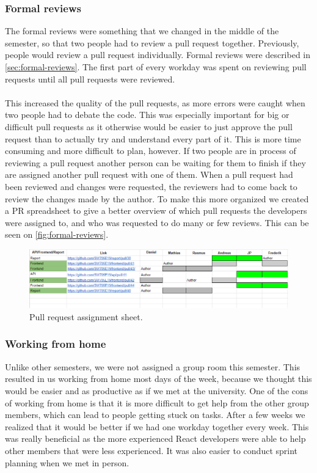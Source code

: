 \subsubsection{Formal reviews}
The formal reviews were something that we changed in the middle of the semester, so that two people had to review a pull request together.
Previously, people would review a pull request individually.
Formal reviews were described in \autoref{sec:formal-reviews}.
The first part of every workday was spent on reviewing pull requests until all pull requests were reviewed.
\\\\
This increased the quality of the pull requests, as more errors were caught when two people had to debate the code.
This was especially important for big or difficult pull requests as it otherwise would be easier to just approve the pull request than to actually try and understand every part of it.
This is more time consuming and more difficult to plan, however.
If two people are in process of reviewing a pull request another person can be waiting for them to finish if they are assigned another pull request with one of them. 
When a pull request had been reviewed and changes were requested, the reviewers had to come back to review the changes made by the author.
To make this more organized we created a PR spreadsheet to give a better overview of which pull requests the developers were assigned to, and who was requested to do many or few reviews.
This can be seen on \autoref{fig:formal-reviews}.
\begin{figure}[H]
    \centering
    \includegraphics[width=\linewidth]{figures/formal-reviews.PNG}
    \caption{Pull request assignment sheet.}
    \label{fig:formal-reviews}
\end{figure}

\subsubsection{Working from home}
Unlike other semesters, we were not assigned a group room this semester.
This resulted in us working from home most days of the week, because we thought this would be easier and as productive as if we met at the university.
One of the cons of working from home is that it is more difficult to get help from the other group members, which can lead to people getting stuck on tasks.
After a few weeks we realized that it would be better if we had one workday together every week.
This was really beneficial as the more experienced React developers were able to help other members that were less experienced.
It was also easier to conduct sprint planning when we met in person.


